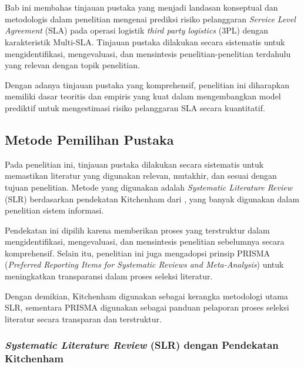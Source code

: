 \chapter{\babDua}
\label{bab:2}

Bab ini membahas tinjauan pustaka yang menjadi landasan konseptual dan metodologis dalam penelitian mengenai prediksi risiko pelanggaran \textit{Service Level Agreement }(SLA) pada operasi logistik \textit{third party logistics} (3PL) dengan karakteristik Multi-SLA. Tinjauan pustaka dilakukan secara sistematis untuk mengidentifikasi, mengevaluasi, dan mensintesis penelitian-penelitian terdahulu yang relevan dengan topik penelitian.

Dengan adanya tinjauan pustaka yang komprehensif, penelitian ini diharapkan memiliki dasar teoritis dan empiris yang kuat dalam mengembangkan model prediktif untuk mengestimasi risiko pelanggaran SLA secara kuantitatif.

\section{Metode Pemilihan Pustaka}
\label{sec:2_1}

Pada penelitian ini, tinjauan pustaka dilakukan secara sistematis untuk memastikan literatur yang digunakan relevan, mutakhir, dan sesuai dengan tujuan penelitian. Metode yang digunakan adalah \textit{Systematic Literature Review} (SLR) berdasarkan pendekatan Kitchenham dari \citep{kitchenham}, yang banyak digunakan dalam penelitian sistem informasi.

Pendekatan ini dipilih karena memberikan proses yang terstruktur dalam mengidentifikasi, mengevaluasi, dan mensintesis penelitian sebelumnya secara komprehensif. Selain itu, penelitian ini juga mengadopsi prinsip PRISMA (\textit{Preferred Reporting Items for Systematic Reviews and Meta-Analysis}) \citep{prisma2021} untuk meningkatkan transparansi dalam proses seleksi literatur.

Dengan demikian, Kitchenham digunakan sebagai kerangka metodologi utama SLR, sementara PRISMA digunakan sebagai panduan pelaporan proses seleksi literatur secara transparan dan terstruktur.

\subsection{\textit{Systematic Literature Review} (SLR) dengan Pendekatan Kitchenham}


